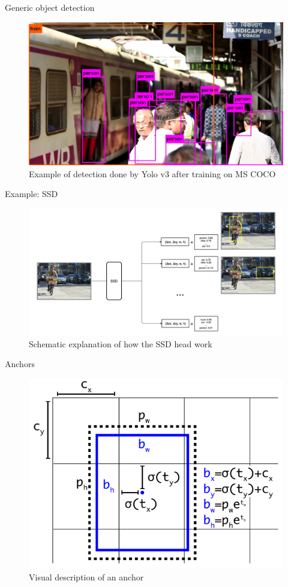 \documentclass{beamer}
\begin{document}
\begin{frame}{Generic object detection}
    \begin{figure}
        \centering
        \includegraphics[width=0.8\linewidth]{figures/YOLOv3_example.png}
        \caption{Example of detection done by Yolo v3 \cite{yolov3} after training on MS COCO \cite{mscoco}}
    \end{figure}{}
\end{frame}{}

\begin{frame}{Example: SSD}
    \begin{figure}
        \centering
        \includegraphics[width=0.8\linewidth]{figures/ssd.jpg}
        \caption{Schematic explanation of how the SSD head work \cite{liu2016ssd}}
    \end{figure}{}
\end{frame}{}

\begin{frame}{Anchors}
    \begin{figure}
        \centering
        \includegraphics[width=0.7\linewidth]{figures/anchors.png}
        \caption{Visual description of an anchor}
    \end{figure}{}
\end{frame}{}
\end{document}
